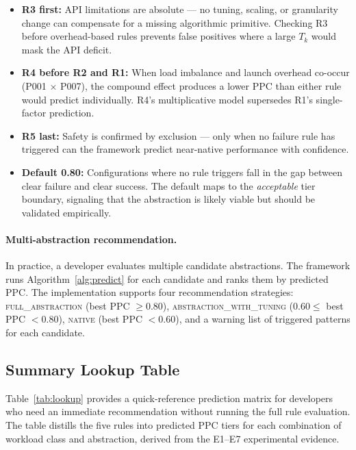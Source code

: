 \begin{itemize}
    \item \textbf{R3 first:} API limitations are absolute --- no tuning,
    scaling, or granularity change can compensate for a missing algorithmic
    primitive. Checking R3 before overhead-based rules prevents false
    positives where a large $T_k$ would mask the API deficit.

    \item \textbf{R4 before R2 and R1:} When load imbalance and launch
    overhead co-occur (P001 $\times$ P007), the compound effect produces a
    lower PPC than either rule would predict individually. R4's
    multiplicative model supersedes R1's single-factor prediction.

    \item \textbf{R5 last:} Safety is confirmed by exclusion --- only when
    no failure rule has triggered can the framework predict near-native
    performance with confidence.

    \item \textbf{Default 0.80:} Configurations where no rule triggers fall
    in the gap between clear failure and clear success. The default maps to
    the \textit{acceptable} tier boundary, signaling that the abstraction is
    likely viable but should be validated empirically.
\end{itemize}

\paragraph{Multi-abstraction recommendation.}
In practice, a developer evaluates multiple candidate abstractions. The
framework runs Algorithm~\ref{alg:predict} for each candidate and ranks
them by predicted PPC. The implementation supports four recommendation
strategies: \textsc{full\_abstraction} (best PPC $\geq 0.80$),
\textsc{abstraction\_with\_tuning} ($0.60 \leq$ best PPC $< 0.80$),
\textsc{native} (best PPC $< 0.60$), and a warning list of triggered
patterns for each candidate.

\subsection{Summary Lookup Table}
\label{subsec:lookup}

Table~\ref{tab:lookup} provides a quick-reference prediction matrix for
developers who need an immediate recommendation without running the full
rule evaluation. The table distills the five rules into predicted PPC tiers
for each combination of workload class and abstraction, derived from the
E1--E7 experimental evidence.

